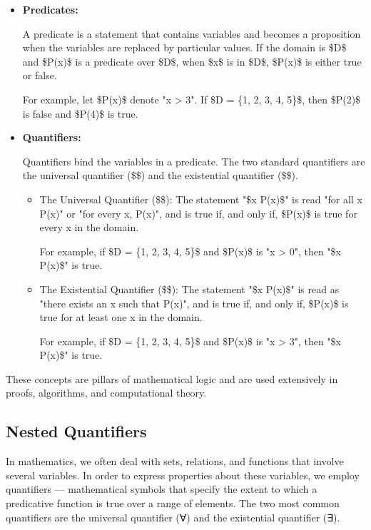 \begin{itemize}
\item \textbf{Predicates:}

A predicate is a statement that contains variables and becomes a proposition when the variables are replaced by particular values. If the domain is \$D\$ and \$P(x)\$ is a predicate over \$D\$, when \$x\$ is in \$D\$, \$P(x)\$ is either true or false.

For example, let \$P(x)\$ denote "x > 3". If \$D = \{1, 2, 3, 4, 5\}\$,
then \$P(2)\$ is false and \$P(4)\$ is true.

\item \textbf{Quantifiers:}

Quantifiers bind the variables in a predicate. The two standard quantifiers are the universal quantifier (\$\forall\$) and the existential quantifier (\$\exists\$).

\begin{itemize}
\item The Universal Quantifier (\$\forall \$): The statement "\$\forall x P(x)\$" is read "for all x P(x)" or "for every x, P(x)", and is true if, and only if, \$P(x)\$ is true for every x in the domain.

For example, if \$D = \{1, 2, 3, 4, 5\}\$ and \$P(x)\$ is "x > 0", then "\$\forall x P(x)\$" is true.

\item The Existential Quantifier (\$\exists \$): The statement "\$\exists x P(x)\$" is read as "there exists an x such that P(x)", and is true if, and only if, \$P(x)\$ is true for at least one x in the domain.

For example, if \$D = \{1, 2, 3, 4, 5\}\$ and \$P(x)\$ is "x > 3", then "\$\exists x P(x)\$" is true.
\end{itemize}
\end{itemize}

These concepts are pillars of mathematical logic and are used extensively in proofs, algorithms, and computational theory.

\subsection{Nested Quantifiers}
In mathematics, we often deal with sets, relations, and functions that involve several variables. In order to express properties about these variables, we employ quantifiers — mathematical symbols that specify the extent to which a predicative function is true over a range of elements. The two most common quantifiers are the universal quantifier (∀) and the existential quantifier (∃).

